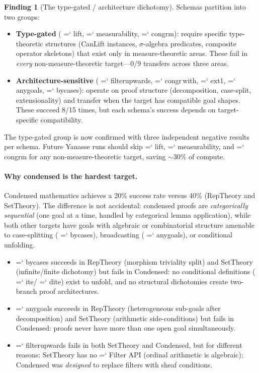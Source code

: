 \documentclass[11pt]{article}
\renewcommand{\texttt}[1]{%
  \begingroup\ttfamily\hyphenchar\font=`\-\relax
  \def\_{\textunderscore\discretionary{}{}{}}%
  #1\endgroup}
\theoremstyle{definition}
\newtheorem{finding}[theorem]{Finding}
\theoremstyle{remark}
\begin{document}
\begin{finding}[The type-gated / architecture dichotomy]%
\label{find:dichotomy}
Schemas partition into two groups:
\begin{itemize}
\item \textbf{Type-gated} (\texttt{lift}, \texttt{measurability},
  \texttt{congrm}): require specific type-theoretic structures
  (CanLift instances, $\sigma$-algebra predicates, composite
  operator skeletons) that exist only in measure-theoretic areas.
  These fail in \emph{every} non-measure-theoretic target---0/9
  transfers across three areas.
\item \textbf{Architecture-sensitive}
  (\texttt{filter\_upwards}, \texttt{congr\,with}, \texttt{ext1},
  \texttt{any\_goals}, \texttt{by\_cases}): operate on proof
  structure (decomposition, case-split, extensionality) and
  transfer when the target has compatible goal shapes.  These
  succeed 8/15 times, but each schema's success depends on
  target-specific compatibility.
\end{itemize}
\end{finding}

The type-gated group is now confirmed with three independent
negative results per schema.  Future Yanasse runs should skip
\texttt{lift}, \texttt{measurability}, and \texttt{congrm}
for any non-measure-theoretic target, saving ${\sim}30$\% of
compute.

\paragraph{Why condensed is the hardest target.}
Condensed mathematics achieves a 20\% success rate versus 40\%
(RepTheory and SetTheory).  The difference is not
accidental: condensed proofs are \emph{categorically sequential}
(one goal at a time, handled by categorical lemma application),
while both other targets have goals with algebraic or combinatorial
structure amenable to case-splitting (\texttt{by\_cases}),
broadcasting (\texttt{any\_goals}), or conditional unfolding.

\begin{itemize}
\item \texttt{by\_cases} succeeds in RepTheory (morphism triviality
  split) and SetTheory (infinite/finite dichotomy) but fails in
  Condensed: no conditional definitions (\texttt{ite}/\texttt{dite})
  exist to unfold, and no structural dichotomies create two-branch
  proof architectures.
\item \texttt{any\_goals} succeeds in RepTheory (heterogeneous
  sub-goals after decomposition) and SetTheory (arithmetic
  side-conditions) but fails in Condensed: proofs never have
  more than one open goal simultaneously.
\item \texttt{filter\_upwards} fails in both SetTheory and
  Condensed, but for different reasons: SetTheory has no
  \texttt{Filter} API (ordinal arithmetic is algebraic);
  Condensed was \emph{designed} to replace filters with
  sheaf conditions.
\end{itemize}
\end{document}
